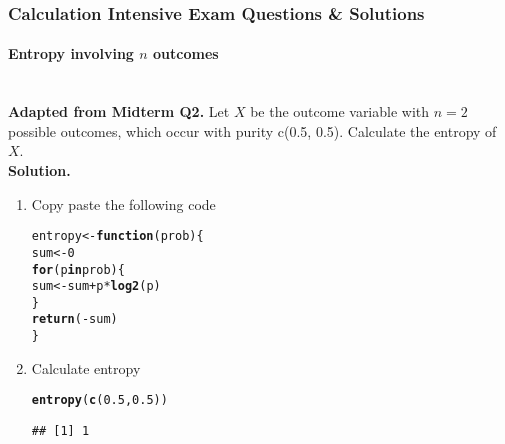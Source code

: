 \documentclass[../../dsa1101_notes.Rtex]{subfiles}\usepackage[]{graphicx}\usepackage[]{color}
\makeatletter
\newcommand{\hlnum}[1]{\textcolor[rgb]{0.686,0.059,0.569}{#1}}%
\newcommand{\hlopt}[1]{\textcolor[rgb]{0,0,0}{#1}}%
\newcommand{\hlstd}[1]{\textcolor[rgb]{0.345,0.345,0.345}{#1}}%
\newcommand{\hlkwa}[1]{\textcolor[rgb]{0.161,0.373,0.58}{\textbf{#1}}}%
\newcommand{\hlkwb}[1]{\textcolor[rgb]{0.69,0.353,0.396}{#1}}%
\newcommand{\hlkwc}[1]{\textcolor[rgb]{0.333,0.667,0.333}{#1}}%
\newcommand{\hlkwd}[1]{\textcolor[rgb]{0.737,0.353,0.396}{\textbf{#1}}}%
\newenvironment{kframe}{%
 \def\at@end@of@kframe{}%
 \ifinner\ifhmode%
  \def\at@end@of@kframe{\end{minipage}}%
  \begin{minipage}{\columnwidth}%
 \fi\fi%
 \def\FrameCommand##1{\hskip\@totalleftmargin \hskip-\fboxsep
 \colorbox{shadecolor}{##1}\hskip-\fboxsep
     \hskip-\linewidth \hskip-\@totalleftmargin \hskip\columnwidth}%
 \MakeFramed {\advance\hsize-\width
   \@totalleftmargin\z@ \linewidth\hsize
   \@setminipage}}%
 {\par\unskip\endMakeFramed%
 \at@end@of@kframe}
\newenvironment{knitrout}{}{} %
\makeatother
\begin{document}
\subsubsection{Calculation Intensive Exam Questions \& Solutions}
\paragraph{Entropy involving $n$ outcomes}\mbox{}\\
\textbf{Adapted from Midterm Q2.} Let \(X\) be the outcome variable with \(n=2\) possible outcomes, which occur with purity c(0.5, 0.5). Calculate the entropy of \(X\).\\
\textbf{Solution.}
\begin{enumerate}
  \item Copy paste the following code
\begin{knitrout}
\color{fgcolor}\begin{kframe}
\begin{alltt}
\hlstd{entropy} \hlkwb{<-} \hlkwa{function}\hlstd{(}\hlkwc{prob}\hlstd{) \{}
  \hlstd{sum} \hlkwb{<-} \hlnum{0}
  \hlkwa{for} \hlstd{(p} \hlkwa{in} \hlstd{prob) \{}
    \hlstd{sum} \hlkwb{<-} \hlstd{sum} \hlopt{+} \hlstd{p} \hlopt{*} \hlkwd{log2}\hlstd{(p)}
  \hlstd{\}}
  \hlkwd{return} \hlstd{(}\hlopt{-}\hlstd{sum)}
\hlstd{\}}
\end{alltt}
\end{kframe}
\end{knitrout}
\item Calculate entropy
\begin{knitrout}
\color{fgcolor}\begin{kframe}
\begin{alltt}
\hlkwd{entropy}\hlstd{(}\hlkwd{c}\hlstd{(}\hlnum{0.5}\hlstd{,} \hlnum{0.5}\hlstd{))}
\end{alltt}
\begin{verbatim}
## [1] 1
\end{verbatim}
\end{kframe}
\end{knitrout}
\end{enumerate}
\end{document}

